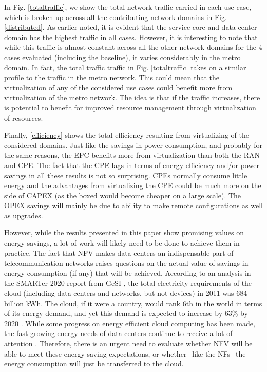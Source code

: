 \documentclass[conference]{IEEEtran}
\begin{document}
In Fig. \ref{totaltraffic}, we show the total network traffic carried in each use case, which is broken up across all the contributing network domains in Fig. \ref{distributed}. As earlier noted, it is evident that the service core and data center domain has the highest traffic in all cases. However, it is interesting to note that while this traffic is almost constant across all the other network domains for the 4 cases evaluated (including the baseline), it varies considerably in the metro domain. In fact, the total traffic traffic in Fig. \ref{totaltraffic} takes on a similar profile to the traffic in the metro network. This could mean that the virtualization of any of the considered use cases could benefit more from virtualization of the metro network. The idea is that if the traffic increases, there is potential to benefit for improved resource management through virtualization of resources.

Finally, \ref{efficiency} shows the total efficiency resulting from virtualizing of the considered domains. Just like the savings in power consumption, and probably for the same reasons, the EPC benefits more from virtualization than both the RAN and CPE. The fact that the CPE lags in terms of energy efficiency and/or power savings in all these results is not so surprising. CPEs normally consume little energy and the advantages from virtualizing the CPE could be much more on the side of CAPEX (as the boxed would become cheaper on a large scale). The OPEX savings will mainly be due to ability to make remote configurations as well as upgrades.


However, while the results presented in this paper show promising values on energy savings, a lot of work will likely need to be done to achieve them in practice. The fact that NFV makes data centers an indispensable part of telecommunication networks raises questions on the actual value of savings in energy consumption (if any) that will be achieved. According to an analysis in the SMARTer 2020 report from GeSI \cite{GESI}, the total electricity requirements of the cloud (including data centers and networks, but not devices) in 2011 was 684 billion kWh. The cloud, if it were a country, would rank 6th in the world in terms of its energy demand, and yet this demand is expected to increase by 63\% by 2020 \cite{CLICKCLEAN}. While some progress on energy efficient cloud computing has been made, the fast growing energy needs of data centers continue to receive a lot of attention \cite{USDCS, BeloglazovBLZ11}. Therefore, there is an urgent need to evaluate whether NFV will be able to meet these energy saving expectations, or whether$-$like the NFs$-$the energy consumption will just be transferred to the cloud. 
\end{document}
